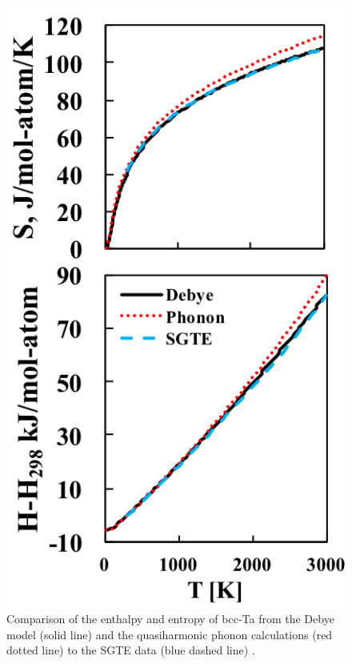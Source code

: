 \pagebreak
\begin{figure}[H]
	\centering
	\includegraphics[scale=1.0]{Chapter-4/Figures/Tafinitetemp.png}
	\caption{Comparison of the enthalpy and entropy of bcc-Ta from the Debye model (solid line) and the quasiharmonic phonon calculations (red dotted line) to the SGTE data (blue dashed line) \cite{Dinsdale1991}.}
	\label{Ch4-figure:Tafinitetemp}
\end{figure}

